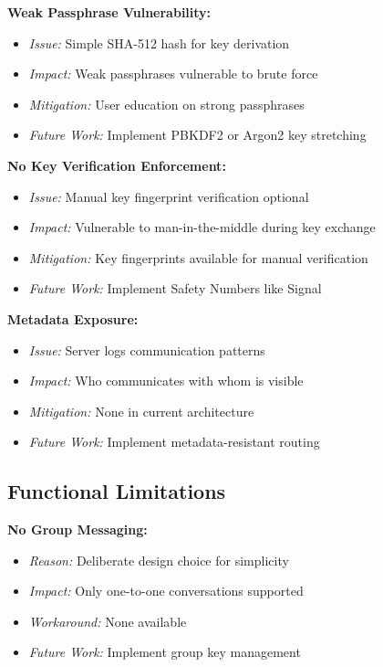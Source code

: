 \textbf{Weak Passphrase Vulnerability:}
\begin{itemize}
    \item \textit{Issue:} Simple SHA-512 hash for key derivation
    \item \textit{Impact:} Weak passphrases vulnerable to brute force
    \item \textit{Mitigation:} User education on strong passphrases
    \item \textit{Future Work:} Implement PBKDF2 or Argon2 key stretching
\end{itemize}

\textbf{No Key Verification Enforcement:}
\begin{itemize}
    \item \textit{Issue:} Manual key fingerprint verification optional
    \item \textit{Impact:} Vulnerable to man-in-the-middle during key exchange
    \item \textit{Mitigation:} Key fingerprints available for manual verification
    \item \textit{Future Work:} Implement Safety Numbers like Signal
\end{itemize}

\textbf{Metadata Exposure:}
\begin{itemize}
    \item \textit{Issue:} Server logs communication patterns
    \item \textit{Impact:} Who communicates with whom is visible
    \item \textit{Mitigation:} None in current architecture
    \item \textit{Future Work:} Implement metadata-resistant routing
\end{itemize}

\subsection{Functional Limitations}

\textbf{No Group Messaging:}
\begin{itemize}
    \item \textit{Reason:} Deliberate design choice for simplicity
    \item \textit{Impact:} Only one-to-one conversations supported
    \item \textit{Workaround:} None available
    \item \textit{Future Work:} Implement group key management
\end{itemize}

